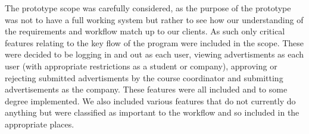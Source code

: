 The prototype scope was carefully considered, as the purpose of the prototype was not
to have a full working system but rather to see how our understanding of the requirements
and workflow match up to our clients. As such only critical features relating to the key
flow of the program were included in the scope. These were decided to be logging in and out
as each user, viewing advertisments as each user (with appropriate restrictions as a student 
or company), approving or rejecting submitted advertisments by the course coordinator and 
submitting advertisements as the company. These features were all included and to some degree
implemented. We also included various features that do not currently do anything but were
classified as important to the workflow and so included in the appropriate places.
